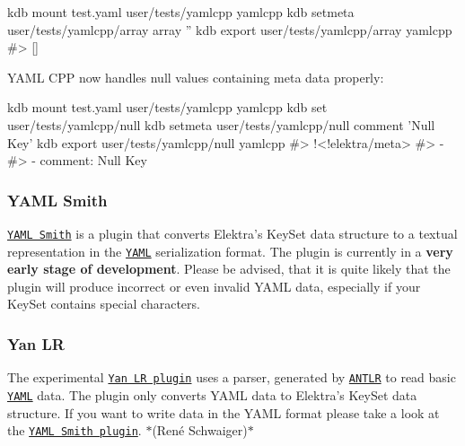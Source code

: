 \begin{DoxyCode}
kdb mount test.yaml user/tests/yamlcpp yamlcpp
kdb setmeta user/tests/yamlcpp/array array ''
kdb export user/tests/yamlcpp/array yamlcpp
#> []
\end{DoxyCode}



\begin{DoxyItemize}
\item Y\+A\+ML C\+PP now handles null values containing meta data properly\+:
\end{DoxyItemize}


\begin{DoxyCode}
kdb mount test.yaml user/tests/yamlcpp yamlcpp
kdb set user/tests/yamlcpp/null
kdb setmeta user/tests/yamlcpp/null comment 'Null Key'
kdb export user/tests/yamlcpp/null yamlcpp
#> !<!elektra/meta>
#> - ~
#> - comment: Null Key
\end{DoxyCode}
 \subsubsection*{Y\+A\+ML Smith}


\begin{DoxyItemize}
\item \href{http://libelektra.org/plugins/yamlsmith}{\tt Y\+A\+ML Smith} is a plugin that converts Elektra’s {\ttfamily Key\+Set} data structure to a textual representation in the \href{http://yaml.org}{\tt Y\+A\+ML} serialization format. The plugin is currently in a {\bfseries very early stage of development}. Please be advised, that it is quite likely that the plugin will produce incorrect or even invalid Y\+A\+ML data, especially if your {\ttfamily Key\+Set} contains special characters.
\end{DoxyItemize}

\subsubsection*{Yan LR}


\begin{DoxyItemize}
\item The experimental \href{http://libelektra.org/plugins/yanlr}{\tt Yan LR plugin} uses a parser, generated by \href{http://www.antlr.org}{\tt A\+N\+T\+LR} to read basic \href{http://yaml.org}{\tt Y\+A\+ML} data. The plugin only converts Y\+A\+ML data to Elektra’s {\ttfamily Key\+Set} data structure. If you want to write data in the Y\+A\+ML format please take a look at the \href{http://libelektra.org/plugins/yamlsmith}{\tt Y\+A\+ML Smith plugin}. $\ast$(René Schwaiger)$\ast$
\end{DoxyItemize}


